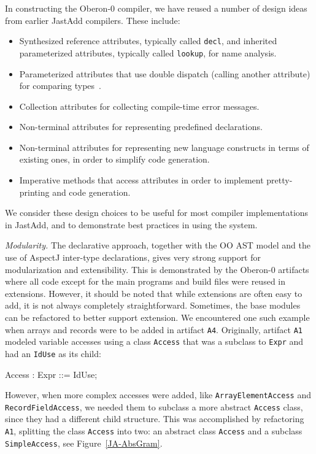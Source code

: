 In constructing the Oberon-0 compiler, we have reused a number of design ideas from earlier JastAdd compilers. These include:
\begin{itemize}
  \item Synthesized reference attributes, typically called \texttt{decl}, and inherited parameterized attributes, typically called \texttt{lookup}, for name analysis.
  \item Parameterized attributes that use double dispatch (calling another attribute) for comparing types~\cite{ekman07oopsla}.
  \item Collection attributes for collecting compile-time error messages.
  \item Non-terminal attributes for representing predefined declarations.
  \item Non-terminal attributes for representing new language constructs in terms of existing ones, in order to simplify code generation.
  \item Imperative methods that access attributes in order to implement pretty-printing and code generation.
\end{itemize}
We consider these design choices to be useful for most compiler implementations in JastAdd, and to demonstrate best practices in using the system.

\emph{Modularity.}
The declarative approach, together with the OO AST model and the use of AspectJ inter-type declarations, gives very strong support for modularization and extensibility. This is demonstrated by the Oberon-0 artifacts where all code except for the main programs and build files were reused in extensions. However, it should be noted that while extensions are often easy to add, it is not always completely straightforward. Sometimes, the base modules can be refactored to better support extension. We encountered one such example when arrays and records were to be added in artifact \texttt{A4}. Originally, artifact \texttt{A1} modeled variable accesses using a class \texttt{Access} that was a subclass to \texttt{Expr} and had an \texttt{IdUse} as its child:

\begin{jastaddcode}
Access : Expr ::= IdUse;
\end{jastaddcode}

However, when more complex accesses were added, like \texttt{ArrayElementAccess} and \texttt{RecordFieldAccess}, we needed them to subclass a more abstract \texttt{Access} class, since they had a different child structure. This was accomplished by refactoring \texttt{A1}, splitting the class \texttt{Access} into two: an abstract class \texttt{Access} and a subclass \texttt{SimpleAccess}, see Figure~\ref{JA-AbsGram}.

